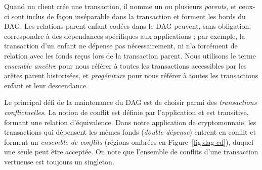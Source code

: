 Quand un client crée une transaction, il nomme un ou plusieurs \emph{parents}, et ceux-ci sont inclus de façon inséparable dans la transaction et forment les bords du DAG\@.
Les relations parent-enfant codées dans le DAG peuvent, sans obligation, correspondre à des dépendances spécifiques aux applications ; par exemple, la transaction d'un enfant ne dépense pas nécessairement, ni n'a forcément de relation avec les fonds reçus lors de la transaction parent.
Nous utilisons le terme \emph{ensemble ancêtre} pour nous référer à toutes les transactions accessibles par les arêtes parent historisées, et \emph{progéniture} pour nous référer à toutes les transactions enfant et leur descendance.

Le principal défi de la maintenance du DAG est de choisir parmi des \emph{transactions conflictuelles}.
La notion de conflit est définie par l'application et est transitive, formant une relation d'équivalence.
Dans notre application de cryptomonnaie, les transactions qui dépensent les mêmes fonds (\emph{double-dépense}) entrent en conflit et forment un \emph{ensemble de conflits}
(régions ombrées en Figure~\ref{fig:dag-cd}), duquel une seule peut être acceptée.
On note que l'ensemble de conflits d'une transaction vertueuse est toujours un singleton.
 
